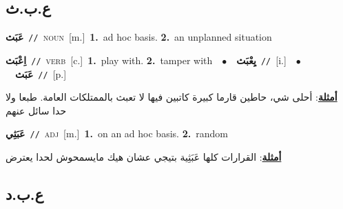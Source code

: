 \documentclass[10pt,a4paper,twoside]{article} %
\begin{document}
\begin{multicols}{2}
\vspace{-3mm}
\subsection*{\color{blue}\foreignlanguage{arabic}{ع.ب.ث}\color{blue}{}} 

{\setlength\topsep{0pt}\textbf{\foreignlanguage{arabic}{عَبَث}}\ {\color{gray}\texttt{//}\color{black}}\ \textsc{noun}\ [m.]\ \textbf{1.}~ad hoc basis.  \textbf{2.}~an unplanned situation\ 

{\setlength\topsep{0pt}\textbf{\foreignlanguage{arabic}{اِعْبَث}}\ {\color{gray}\texttt{//}\color{black}}\ \textsc{verb}\ [c.]\ \textbf{1.}~play with.  \textbf{2.}~tamper with\ \ $\bullet$\ \ \setlength\topsep{0pt}\textbf{\foreignlanguage{arabic}{يِعْبَث}}\ {\color{gray}\texttt{//}\color{black}}\ [i.]\ \ $\bullet$\ \ \setlength\topsep{0pt}\textbf{\foreignlanguage{arabic}{عَبَث}}\ {\color{gray}\texttt{//}\color{black}}\ [p.]\  \begin{flushright}\color{gray}\foreignlanguage{arabic}{\textbf{\underline{\foreignlanguage{arabic}{أمثلة}}}: أحلى شي، حاطين قارما كبيرة كاتبين فيها لا تعبث بالممتلكات العامة. طبعا ولا حدا سائل عنهم}\end{flushright}\color{black}} \vspace{2mm}

{\setlength\topsep{0pt}\textbf{\foreignlanguage{arabic}{عَبَثِي}}\ {\color{gray}\texttt{//}\color{black}}\ \textsc{adj}\ [m.]\ \textbf{1.}~on an ad hoc basis.  \textbf{2.}~random\  \begin{flushright}\color{gray}\foreignlanguage{arabic}{\textbf{\underline{\foreignlanguage{arabic}{أمثلة}}}: القرارات كلها عَبَثِية بتيجي عشان هيك مايسمحوش لحدا يعترض}\end{flushright}\color{black}} \vspace{2mm}

\vspace{-3mm}
\subsection*{\color{blue}\foreignlanguage{arabic}{ع.ب.د}\color{blue}{}} 

}
\end{multicols}
\end{document}
